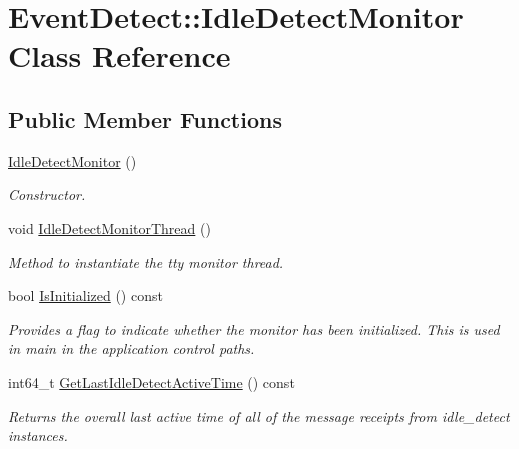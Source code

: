 \hypertarget{classEventDetect_1_1IdleDetectMonitor}{}\section{Event\+Detect\+:\+:Idle\+Detect\+Monitor Class Reference}
\label{classEventDetect_1_1IdleDetectMonitor}
\subsection*{Public Member Functions}
\begin{DoxyCompactItemize}
\item 
\mbox{\label{classEventDetect_1_1IdleDetectMonitor_aed0b4d13a0d9d3416fae76835f094d90}} 
\mbox{\hyperlink{classEventDetect_1_1IdleDetectMonitor_aed0b4d13a0d9d3416fae76835f094d90}{Idle\+Detect\+Monitor}} ()
\begin{DoxyCompactList}\small\item\em Constructor. \end{DoxyCompactList}\item 
\mbox{\label{classEventDetect_1_1IdleDetectMonitor_a03e59f3ae8ea4e93677f6684556d408f}} 
void \mbox{\hyperlink{classEventDetect_1_1IdleDetectMonitor_a03e59f3ae8ea4e93677f6684556d408f}{Idle\+Detect\+Monitor\+Thread}} ()
\begin{DoxyCompactList}\small\item\em Method to instantiate the tty monitor thread. \end{DoxyCompactList}\item 
bool \mbox{\hyperlink{classEventDetect_1_1IdleDetectMonitor_af945f0f33b8c0fe2c8ee33bd9ac83f12}{Is\+Initialized}} () const
\begin{DoxyCompactList}\small\item\em Provides a flag to indicate whether the monitor has been initialized. This is used in main in the application control paths. \end{DoxyCompactList}\item 
int64\+\_\+t \mbox{\hyperlink{classEventDetect_1_1IdleDetectMonitor_acc4bec04aa1e47e5e7e7fae87cdf2b76}{Get\+Last\+Idle\+Detect\+Active\+Time}} () const
\begin{DoxyCompactList}\small\item\em Returns the overall last active time of all of the message receipts from idle\+\_\+detect instances. \end{DoxyCompactList}\end{DoxyCompactItemize}
